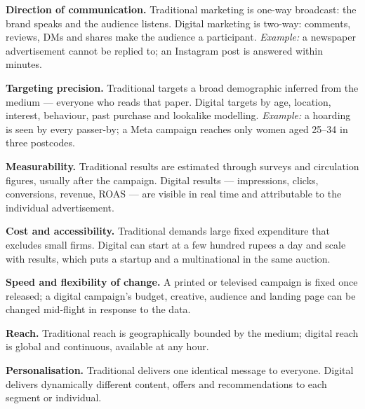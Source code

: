 \begin{qlist}
\begin{apts}
\item \textbf{Direction of communication.} Traditional marketing is one-way
      broadcast: the brand speaks and the audience listens. Digital marketing is
      two-way: comments, reviews, DMs and shares make the audience a
      participant. \emph{Example:} a newspaper advertisement cannot be replied
      to; an Instagram post is answered within minutes.
\item \textbf{Targeting precision.} Traditional targets a broad demographic
      inferred from the medium --- everyone who reads that paper. Digital
      targets by age, location, interest, behaviour, past purchase and lookalike
      modelling. \emph{Example:} a hoarding is seen by every passer-by; a Meta
      campaign reaches only women aged 25--34 in three postcodes.
\item \textbf{Measurability.} Traditional results are estimated through surveys
      and circulation figures, usually after the campaign. Digital results ---
      impressions, clicks, conversions, revenue, ROAS --- are visible in real
      time and attributable to the individual advertisement.
\item \textbf{Cost and accessibility.} Traditional demands large fixed
      expenditure that excludes small firms. Digital can start at a few hundred
      rupees a day and scale with results, which puts a startup and a
      multinational in the same auction.
\item \textbf{Speed and flexibility of change.} A printed or televised campaign
      is fixed once released; a digital campaign's budget, creative, audience
      and landing page can be changed mid-flight in response to the data.
\item \textbf{Reach.} Traditional reach is geographically bounded by the medium;
      digital reach is global and continuous, available at any hour.
\item \textbf{Personalisation.} Traditional delivers one identical message to
      everyone. Digital delivers dynamically different content, offers and
      recommendations to each segment or individual.
\end{apts}


\end{qlist}
